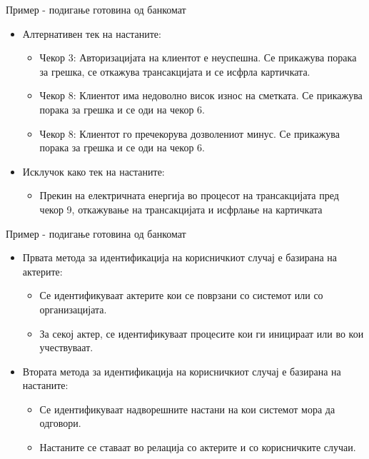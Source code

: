 \begin{frame}{Пример - подигање готовина од банкомат}
\begin{itemize}
  \item Алтернативен тек на настаните:
  \begin{itemize}
    \item Чекор 3: Авторизацијата на клиентот е неуспешна. Се прикажува порака
за грешка, се откажува трансакцијата и се исфрла картичката.
  \item Чекор 8: Клиентот има недоволно висок износ на сметката. Се прикажува
  порака за грешка и се оди на чекор 6.
  \item Чекор 8: Клиентот го пречекорува дозволениот минус. Се прикажува порака
  за грешка и се оди на чекор 6.
\end{itemize}
  \item Исклучок како тек на настаните:
  \begin{itemize}
  \item Прекин на електричната енергија во процесот на трансакцијата пред чекор 9, откажување на трансакцијата и исфрлање на картичката
\end{itemize}
\end{itemize}
\end{frame}

\begin{frame}{Пример - подигање готовина од банкомат}
\begin{itemize}
  \item Првата метода за идентификација на корисничкиот случај е базирана на актерите:
  \begin{itemize}
    \item Се идентификуваат актерите кои се поврзани со системот или со организацијата.
  \item За секој актер, се идентификуваат процесите кои ги иницираат или во кои учествуваат.
\end{itemize}
  \item Втората метода за идентификација на корисничкиот случај е базирана на настаните:
  \begin{itemize}
  \item Се идентификуваат надворешните настани на кои системот мора да одговори.
  \item Настаните се ставаат во релација со актерите и со корисничките случаи.
\end{itemize}
\end{itemize}
\end{frame}

